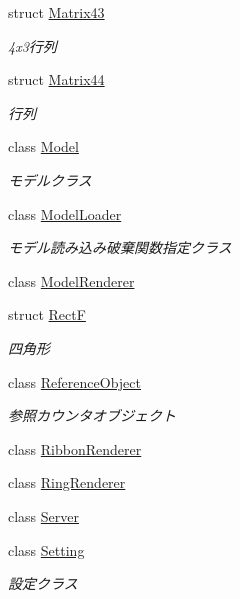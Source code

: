\begin{DoxyCompactItemize}
struct \mbox{\hyperlink{struct_effekseer_1_1_matrix43}{Matrix43}}
\begin{DoxyCompactList}\small\item\em 4x3行列 \end{DoxyCompactList}\item 
struct \mbox{\hyperlink{struct_effekseer_1_1_matrix44}{Matrix44}}
\begin{DoxyCompactList}\small\item\em 行列 \end{DoxyCompactList}\item 
class \mbox{\hyperlink{class_effekseer_1_1_model}{Model}}
\begin{DoxyCompactList}\small\item\em モデルクラス \end{DoxyCompactList}\item 
class \mbox{\hyperlink{class_effekseer_1_1_model_loader}{Model\+Loader}}
\begin{DoxyCompactList}\small\item\em モデル読み込み破棄関数指定クラス \end{DoxyCompactList}\item 
class \mbox{\hyperlink{class_effekseer_1_1_model_renderer}{Model\+Renderer}}
\item 
struct \mbox{\hyperlink{struct_effekseer_1_1_rect_f}{RectF}}
\begin{DoxyCompactList}\small\item\em 四角形 \end{DoxyCompactList}\item 
class \mbox{\hyperlink{class_effekseer_1_1_reference_object}{Reference\+Object}}
\begin{DoxyCompactList}\small\item\em 参照カウンタオブジェクト \end{DoxyCompactList}\item 
class \mbox{\hyperlink{class_effekseer_1_1_ribbon_renderer}{Ribbon\+Renderer}}
\item 
class \mbox{\hyperlink{class_effekseer_1_1_ring_renderer}{Ring\+Renderer}}
\item 
class \mbox{\hyperlink{class_effekseer_1_1_server}{Server}}
\item 
class \mbox{\hyperlink{class_effekseer_1_1_setting}{Setting}}
\begin{DoxyCompactList}\small\item\em 設定クラス \end{DoxyCompactList}\item 

\end{DoxyCompactItemize}
